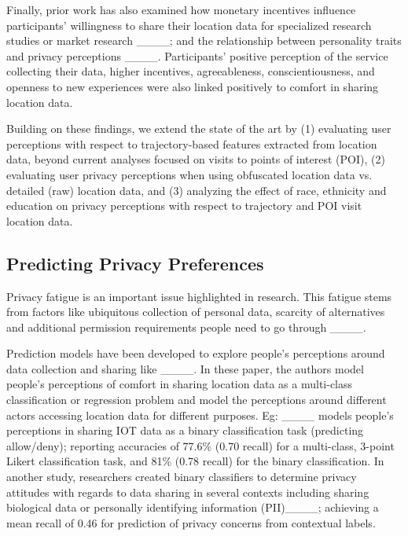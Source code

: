 Finally, prior work has also examined how monetary incentives influence participants' willingness to share their location data for specialized research studies or market research ____; and the relationship between personality traits and privacy perceptions ____. Participants' positive perception of the service collecting their data, higher incentives, agreeableness, conscientiousness, and openness to new experiences were also linked positively to comfort in sharing location data.  

Building on these findings, we extend the state of the art by (1) evaluating user perceptions with respect to trajectory-based features extracted from location data, beyond current analyses focused on visits to points of interest (POI), (2) evaluating user privacy perceptions when using obfuscated location data vs. detailed (raw) location data, and (3) analyzing the effect of race, ethnicity and education on privacy perceptions with respect to trajectory and POI visit location data. 

\subsection{Predicting Privacy Preferences}
Privacy fatigue is an important issue highlighted in research. This fatigue stems from factors like ubiquitous collection of personal data, scarcity of alternatives and additional permission requirements people need to go through ____. 

Prediction models have been developed to explore people's perceptions around data collection and sharing like ____. In these paper, the authors model people's perceptions of comfort in sharing location data as a multi-class classification or regression problem and model the perceptions around different actors accessing location data for different purposes. Eg: ____ models people's perceptions in sharing IOT data as a binary classification task (predicting allow/deny); reporting accuracies of 77.6\% (0.70 recall) for a multi-class, 3-point Likert classification task, and 
81\% (0.78 recall) for the binary classification.
In another study, researchers created binary classifiers to determine privacy attitudes with regards to data sharing in several contexts including sharing biological data or personally identifying information (PII)____; achieving a mean recall of 0.46 for prediction of privacy concerns from contextual labels. 

